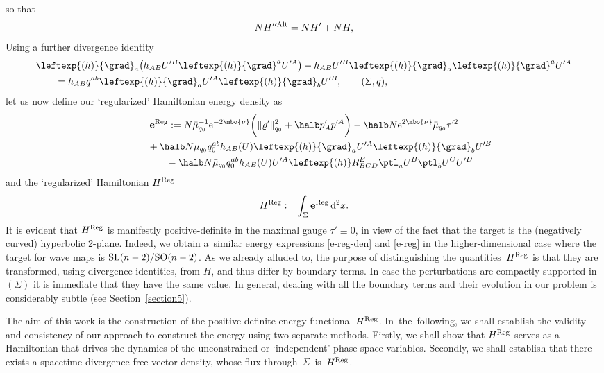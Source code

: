 so that
\begin{align}
NH''^{{\rm Alt}} = NH' + NH,
\end{align}
\fi
Using a further divergence identity
\begin{align*}
& \leftexp{(h)}{\grad}_a \bigl(h_{AB} U'^B \leftexp{(h)}{\grad} ^a U'^A\bigr) - h_{AB} U'^B \leftexp{(h)}{\grad}_a \leftexp{(h)}{\grad}^a U'^A \notag\\
&\qquad{}= h_{AB} q^{ab} \leftexp{(h)}{\grad}_a U'^A \leftexp{(h)}{\grad}_b U'^B, \qquad (\Sigma, q),
\end{align*}
let us now define our `regularized' Hamiltonian energy density as
\begin{gather}
\mathbf{e}^{{\rm Reg}} := N \bar{\mu}^{-1}_{q_0} {\rm e}^{-2 \mbo{\nu}} \biggl(\Vert \varrho' \Vert^2_{q_0} + \halb p'_A p'^A \biggr) - \halb N {\rm e}^{2 \mbo{\nu}} \bar{\mu}_{q_0} \tau'^2 \notag\\ \hphantom{\mathbf{e}^{{\rm Reg}} :=}{}
+ \halb N \bar{\mu}_{q_0} q_0^{ab} h_{AB}(U) \leftexp{(h)}{\grad}_a U'^A \leftexp{(h)}{\grad}_b U'^B \notag\\ \hphantom{\mathbf{e}^{{\rm Reg}} :=}{}
- \halb N \bar{\mu}_{q_0} q^{ab}_0 h_{AE} (U) U'^A \leftexp{(h)}R^E _{BCD} \ptl_a U^B \ptl_b U^C U'^D \label{e-reg-den}
\end{gather}
and the `regularized' Hamiltonian $H^{{\rm Reg}}$
\begin{align} \label{e-reg}
H^{{\rm Reg}} := \int_{\Sigma} \mathbf{e}^{{\rm Reg}} \, {\rm d}^2 x.
\end{align}
It is evident that $H^{{\rm Reg}}$ is manifestly positive-definite in the maximal gauge $\tau' \equiv 0$, in view of the fact that the target is the (negatively curved) hyperbolic 2-plane. Indeed, we obtain a~similar energy expressions \eqref{e-reg-den} and \eqref{e-reg} in the higher-dimensional case where the target for wave maps is ${\rm SL}(n-2)/{\rm SO}(n-2)$.
As we already alluded to, the purpose of distinguishing the quantities~$H^{{\rm Reg}}$ is that they are transformed, using divergence identities, from $H$, and thus differ by boundary terms. In case the perturbations are compactly supported in $(\Sigma)$ it is immediate that they have the same value. In general, dealing with all the boundary terms and their evolution in our problem is considerably subtle (see Section~\ref{section5}).

 The aim of this work is the construction of the positive-definite energy functional $H^{{\rm Reg}}$. In~the~following, we shall establish the validity and consistency of our approach to construct the energy using two separate methods. Firstly, we shall show that $H^{{\rm Reg}}$ serves as a Hamiltonian that drives the dynamics of the unconstrained or `independent' phase-space variables. Secondly, we shall establish that there exists a spacetime divergence-free vector density, whose flux through~$\Sigma$~is~$H^{{\rm Reg}}$.

